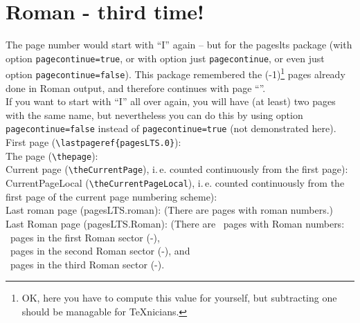 \documentclass[british]{article}
\begin{document}
\newpage


\section{Roman - third time!\label{Roman3}}

The page number would start with
\textquotedblleft I\textquotedblright{} again -- but
for the \textsf{pageslts} package (with option \texttt{pagecontinue=true},
or with option just \texttt{pagecontinue}, or even just
 option \texttt{pagecontinue=false}).
This package remembered the
(-1)\footnote{OK, here %
you have to compute this value for yourself, but %
subtracting one should be managable for \TeX nicians.} pages already
done in Roman output, and therefore continues with page
\textquotedblleft \thepage \textquotedblright .\\
If you want to start with \textquotedblleft I\textquotedblright{} all
over again, you will have (at least) two pages with the same name,
but nevertheless you can do this by using option
\texttt{pagecontinue=false} instead of \texttt{pagecontinue=true}
(not demonstrated here).\\

\noindent First page (\verb|\lastpageref{pagesLTS.0}|):
 \\

\noindent The page (\verb|\thepage|): \thepage \\

\noindent Current page (\verb|\theCurrentPage|),
i.\,e. counted continuously from the first page): \theCurrentPage \\

\noindent CurrentPageLocal (\verb|\theCurrentPageLocal|),
i.\,e. counted continuously from the first page of the
current page numbering scheme): \theCurrentPageLocal \\

\noindent Last roman page (pagesLTS.roman): 
(There are  pages with roman numbers.)\\

\noindent Last Roman page (pagesLTS.Roman): 
(There are ~pages with Roman numbers:\\
~pages in the first Roman sector
(\pageref{Roman}{\hskip3em }-),\\
~pages in the second Roman sector
(\pageref{Roman2}{\hskip3em }-), and\\
~pages in the third Roman sector
(\pageref{Roman3}{\hskip3em }-).\\
\end{document}
